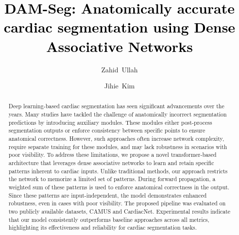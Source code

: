 \documentclass[preprint,12pt]{elsarticle}
\newcommand*{\updatedText}[1]{\textcolor{black}{ #1}}
\begin{document}
\begin{frontmatter}

\title{\updatedText{DAM-Seg: Anatomically accurate cardiac segmentation using Dense Associative Networks}}

\author[aff1]{Zahid~Ullah}
\author[aff1]{Jihie~Kim}


\address[aff1]{Division of AI Software Convergence, Dongguk University,
	Seoul 04620, Republic of Korea}


\begin{abstract}
Deep learning-based cardiac segmentation has seen significant advancements over the years. Many studies have tackled the challenge of anatomically incorrect segmentation predictions by introducing auxiliary modules. These modules either post-process segmentation outputs or enforce consistency between specific points to ensure anatomical correctness. However, such approaches often increase network complexity, require separate training for these modules, and may lack robustness in scenarios with poor visibility. To address these limitations, we propose a novel transformer-based architecture that leverages dense associative networks to learn and retain specific patterns inherent to cardiac inputs. Unlike traditional methods, our approach restricts the network to memorize a limited set of patterns. During forward propagation, a weighted sum of these patterns is used to enforce anatomical correctness in the output. Since these patterns are input-independent, the model demonstrates enhanced robustness, even in cases with poor visibility. The proposed pipeline was evaluated on two publicly available datasets, CAMUS and CardiacNet. Experimental results indicate that our model consistently outperforms baseline approaches across all metrics, highlighting its effectiveness and reliability for cardiac segmentation tasks.
\end{abstract}


\end{frontmatter}
\end{document}
